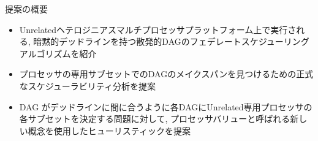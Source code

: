
\begin{frame}{提案の概要}
    \begin{itemize}
        \item Unrelatedヘテロジニアスマルチプロセッサプラットフォーム上で実行される, 暗黙的デッドラインを持つ散発的DAGのフェデレートスケジューリングアルゴリズムを紹介

        \item プロセッサの専用サブセットでのDAGのメイクスパンを見つけるための正式なスケジューラビリティ分析を提案

        \item DAG がデッドラインに間に合うように各DAGにUnrelated専用プロセッサの各サブセットを決定する問題に対して, プロセッサバリューと呼ばれる新しい概念を使用したヒューリスティックを提案
    \end{itemize}
\end{frame}

